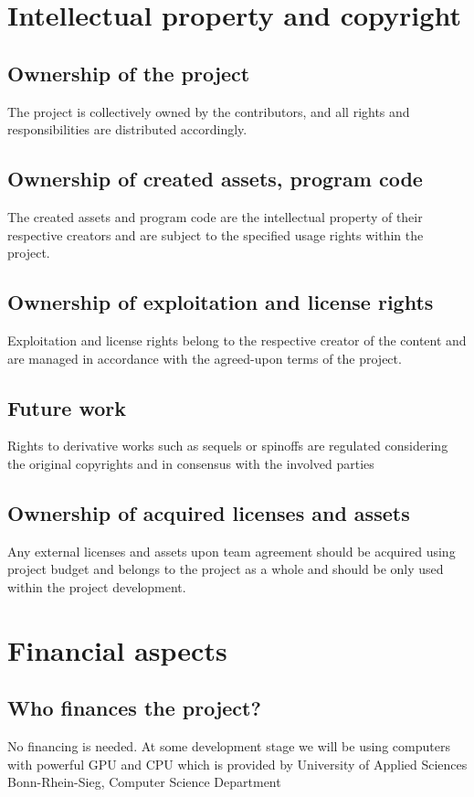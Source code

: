 \documentclass{article}
\begin{document}
\section{Intellectual property and copyright}
\subsection{Ownership of the project}
The project is collectively owned by the contributors, and all rights and responsibilities are distributed accordingly.
\subsection{Ownership of created assets, program code}
The created assets and program code are the intellectual property of their respective creators and are subject to the specified usage rights within the project.
\subsection{Ownership of exploitation and license rights}
Exploitation and license rights belong to the respective creator of the content and are managed in accordance with the agreed-upon terms of the project.
\subsection{Future work}
Rights to derivative works such as sequels or spinoffs are regulated considering the original copyrights and in consensus with the involved parties
\subsection{Ownership of acquired licenses and assets}
Any external licenses and assets upon team agreement should be acquired using project budget and belongs to the project as a whole and should be only used within the project development.

\section{Financial aspects}
\subsection{Who finances the project?}
No financing is needed. At some development stage we will be using computers with powerful GPU and CPU which is provided by University of Applied Sciences Bonn-Rhein-Sieg, Computer Science Department
\end{document}
